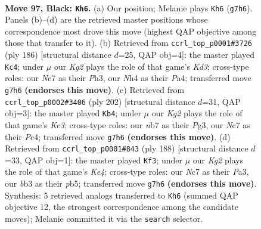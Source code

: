 \documentclass[11pt]{article}
\begin{document}
\clearpage

\begin{figure}[p]\centering
\begin{subfigure}{0.46\textwidth}\centering
\resizebox{\linewidth}{!}{%
\newchessgame
\chessboard[
  setfen={8/1Nn3k1/8/8/Pp2P2n/1B2p3/K2b3p/8 b - - 3 97},
  showmover=false,
  pgfstyle=straightmove, color=movearrow, markmove={g7-h6}
]}
\caption{}
\end{subfigure}\hfill
\begin{subfigure}{0.46\textwidth}\centering
\resizebox{\linewidth}{!}{%
\newchessgame
\chessboard[
  setfen={8/8/8/p3p3/P3P1Bp/3K3P/5b2/4k3 w - - 83 94},
  showmover=false,
  pgfstyle=straightmove, color=movearrow, markmove={d3-c4}
]}
\caption{}
\end{subfigure}
\\[4pt]
\begin{subfigure}{0.46\textwidth}\centering
\resizebox{\linewidth}{!}{%
\newchessgame
\chessboard[
  setfen={8/3k4/2b3p1/2P5/p1PB3P/2K3P1/8/8 w - - 29 102},
  showmover=false,
  pgfstyle=straightmove, color=movearrow, markmove={c3-b4}
]}
\caption{}
\end{subfigure}\hfill
\begin{subfigure}{0.46\textwidth}\centering
\resizebox{\linewidth}{!}{%
\newchessgame
\chessboard[
  setfen={8/1p1b4/8/1p2B2k/4K3/P7/1P5P/8 w - - 47 95},
  showmover=false,
  pgfstyle=straightmove, color=movearrow, markmove={e4-f3}
]}
\caption{}
\end{subfigure}
\caption{\textbf{Move 97, Black: \texttt{Kh6}.} (a) Our position; Melanie plays \texttt{Kh6} (\texttt{g7h6}). Panels (b)--(d) are the retrieved master positions whose correspondence most drove this move (highest QAP objective among those that transfer to it). (b) Retrieved from \texttt{ccrl\_top\_p0001\#3726} (ply 186) [structural distance $d$=25, QAP obj=4]: the master played \texttt{Kc4}; under $\mu$ our \emph{Kg2} plays the role of that game's \emph{Kd3}; cross-type roles: our \emph{N}c7 as their \emph{P}h3, our \emph{N}h4 as their \emph{P}a4; transferred move \texttt{g7h6} \textbf{(endorses this move)}. (c) Retrieved from \texttt{ccrl\_top\_p0002\#3406} (ply 202) [structural distance $d$=31, QAP obj=3]: the master played \texttt{Kb4}; under $\mu$ our \emph{Kg2} plays the role of that game's \emph{Kc3}; cross-type roles: our \emph{n}b7 as their \emph{P}g3, our \emph{N}c7 as their \emph{P}c4; transferred move \texttt{g7h6} \textbf{(endorses this move)}. (d) Retrieved from \texttt{ccrl\_top\_p0001\#843} (ply 188) [structural distance $d$=33, QAP obj=1]: the master played \texttt{Kf3}; under $\mu$ our \emph{Kg2} plays the role of that game's \emph{Ke4}; cross-type roles: our \emph{N}c7 as their \emph{P}a3, our \emph{b}b3 as their \emph{p}b5; transferred move \texttt{g7h6} \textbf{(endorses this move)}. Synthesis: 5 retrieved analogs transferred to \texttt{Kh6} (summed QAP objective 12, the strongest correspondence among the candidate moves); Melanie committed it via the \texttt{search} selector.}
\label{fig:thought-m193}
\end{figure}
\end{document}
